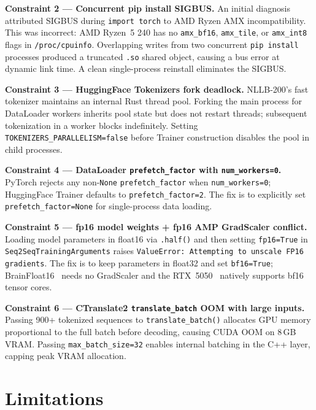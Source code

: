 \documentclass[journal]{IEEEtran}
\begin{document}
\textbf{Constraint 2 --- Concurrent pip install SIGBUS.}
An initial diagnosis attributed SIGBUS during \texttt{import torch} to AMD Ryzen AMX
incompatibility.
This was incorrect: AMD Ryzen~5 240 has no \texttt{amx\_bf16}, \texttt{amx\_tile},
or \texttt{amx\_int8} flags in \texttt{/proc/cpuinfo}.
Overlapping writes from two concurrent \texttt{pip install} processes produced a
truncated \texttt{.so} shared object, causing a bus error at dynamic link time.
A clean single-process reinstall eliminates the SIGBUS.

\textbf{Constraint 3 --- HuggingFace Tokenizers fork deadlock.}
NLLB-200's fast tokenizer maintains an internal Rust thread pool.
Forking the main process for DataLoader workers inherits pool state but does not
restart threads; subsequent tokenization in a worker blocks indefinitely.
Setting \texttt{TOKENIZERS\_PARALLELISM=false} before Trainer construction disables
the pool in child processes.

\textbf{Constraint 4 --- DataLoader \texttt{prefetch\_factor} with \texttt{num\_workers=0}.}
PyTorch rejects any non-\texttt{None} \texttt{prefetch\_factor} when
\texttt{num\_workers=0}; HuggingFace Trainer defaults to \texttt{prefetch\_factor=2}.
The fix is to explicitly set \texttt{prefetch\_factor=None} for single-process data
loading.

\textbf{Constraint 5 --- fp16 model weights + fp16 AMP GradScaler conflict.}
Loading model parameters in float16 via \texttt{.half()} and then setting
\texttt{fp16=True} in \texttt{Seq2SeqTrainingArguments} raises
\texttt{ValueError: Attempting to unscale FP16 gradients}.
The fix is to keep parameters in float32 and set \texttt{bf16=True};
BrainFloat16~\cite{micikevicius2018mixed} needs no GradScaler and the
RTX~5050~\cite{nvidia_blackwell} natively supports bf16 tensor cores.

\textbf{Constraint 6 --- CTranslate2 \texttt{translate\_batch} OOM with large inputs.}
Passing 900+ tokenized sequences to \texttt{translate\_batch()} allocates GPU memory
proportional to the full batch before decoding, causing CUDA OOM on 8\,GB VRAM.
Passing \texttt{max\_batch\_size=32} enables internal batching in the C++ layer,
capping peak VRAM allocation.

\section{Limitations}
\label{sec:limits}
\end{document}
